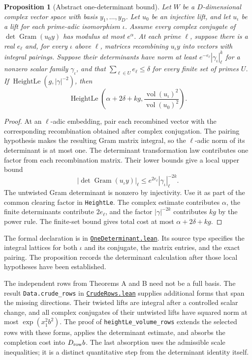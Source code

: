 \documentclass[11pt,oneside,openany]{amsbook}
\newtheorem{proposition}[theorem]{Proposition}
\theoremstyle{remark}
\numberwithin{equation}{section}
\newcommand{\ghroot}{https://github.com/lsernau/grh-lean/blob/}
\newcommand{\ghrev}{72fead102f663d5c7a407964a13dc0cf9d977207}
\newcommand{\leanfile}[2]{%
  \href{\ghroot\ghrev/grh-compact/src/#1}{\nolinkurl{#2}}}
\begin{document}
\begin{proposition}[Abstract one-determinant bound]
\label{prop:one-determinant}
Let $W$ be a $D$-dimensional complex vector space with
basis $y_1,\ldots,y_D$. Let $u_0$ be an injective lift,
and let $u_\iota$ be a lift for each prime-adic
isomorphism $\iota$. Assume every complex conjugate of
$\det\operatorname{Gram}(u_0y)$ has modulus at most
$e^\alpha$. At each prime $\ell$, suppose there is a
real $e_\ell$ and, for every $\iota$ above $\ell$,
matrices recombining $u_\iota y$ into vectors with
integral pairings. Suppose their determinants have
norm at least $e^{-e_\ell}|\gamma_\iota|_\ell^k$
for a nonzero scalar family $\gamma_\iota$, and that
$\sum_{\ell\in U}e_\ell\le\delta$ for every finite
set of primes $U$. If
$\operatorname{HeightLe}(g,|\gamma|^{-2})$, then
\[
\operatorname{HeightLe}\!\left(\alpha+2\delta+kg,
\frac{\operatorname{vol}(u_\iota)^2}
     {\operatorname{vol}(u_0)^2}\right).
\]
\end{proposition}
\begin{proof}
At an $\ell$-adic embedding, pair each recombined
vector with the corresponding recombination obtained
after complex conjugation. The pairing hypothesis
makes the resulting Gram matrix integral, so the
$\ell$-adic norm of its determinant is at most one.
The determinant transformation law contributes one
factor from each recombination matrix. Their lower
bounds give a local upper bound
\[
\left|\det\operatorname{Gram}(u_\iota y)\right|_\ell
 \le e^{2e_\ell}|\gamma_\iota|_\ell^{-2k}.
\]
The untwisted Gram determinant is nonzero by
injectivity. Use it as part of the common clearing
factor in \texttt{HeightLe}. The complex estimate
contributes $\alpha$, the finite determinants contribute
$2e_\ell$, and the factor $|\gamma|^{-2k}$
contributes $kg$ by the power rule. The finite-set
bound gives total cost at most
$\alpha+2\delta+kg$.
\end{proof}
The formal declaration is  in
\leanfile{New/Heights/OneDeterminant.lean}%
{OneDeterminant.lean}. Its source type specifies the
integral lattices for both $\iota$ and its conjugate,
the matrix entries, and the exact pairing. The
proposition records the determinant calculation after
those local hypotheses have been established.

The independent rows from Theorems A and B need not be a
full basis. The result \texttt{Data.crude\_rows} in
\leanfile{New/Exchange/CrudeRows.lean}{CrudeRows.lean}
supplies additional forms that span the missing directions.
Their twisted lifts are integral after a controlled scalar
change, and all complex conjugates of their untwisted lifts
have squared norm at most $\exp(x_1^2b^2)$. The proof of
\texttt{heightLe\_volume\_rows} extends the selected rows
with these forms, applies the determinant estimate, and
absorbs the completion cost into $D_{\rm row}b$. The
last absorption uses the admissible scale inequalities;
it is a distinct quantitative step from the determinant
identity itself.
\end{document}

